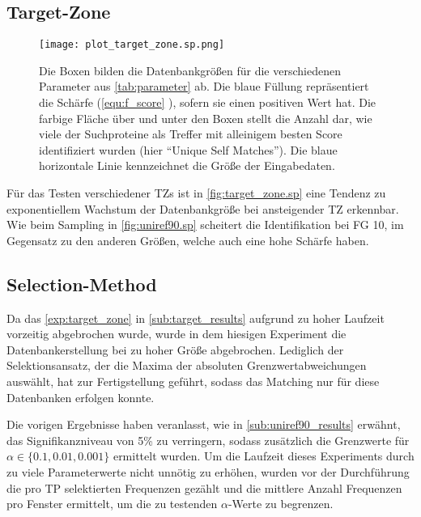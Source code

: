     \subsection{Target-Zone} %
        \label{sub:target_results}
        \begin{figure}[H]
            \centering
            \texttt{[image: plot\_target\_zone.sp.png]}
            \caption[Single-Protein-Matching ]{Die Boxen bilden die Datenbankgrößen für die verschiedenen Parameter aus \autoref{tab:parameter} ab. Die blaue Füllung repräsentiert die Schärfe (\autoref{equ:f_score} ), sofern sie einen positiven Wert hat. Die farbige Fläche über und unter den Boxen stellt die Anzahl dar, wie viele der Suchproteine als Treffer mit alleinigem besten Score identifiziert wurden (hier ``Unique Self Matches''). Die blaue horizontale Linie kennzeichnet die Größe der Eingabedaten.}
            \label{fig:target_zone.sp}
        \end{figure}

        Für das Testen verschiedener \aclp{TZ} ist in \autoref{fig:target_zone.sp} eine Tendenz zu exponentiellem Wachstum der Datenbankgröße bei ansteigender \ac{TZ} erkennbar. Wie beim Sampling in \autoref{fig:uniref90.sp} scheitert die Identifikation bei \ac{FG} 10, im Gegensatz zu den anderen Größen, welche auch eine hohe Schärfe haben.

    \subsection{Selection-Method} %
        \label{sub:selection_results}
        Da das \autoref{exp:target_zone} in \autoref{sub:target_results} aufgrund zu hoher Laufzeit vorzeitig abgebrochen wurde, wurde in dem hiesigen Experiment die Datenbankerstellung bei zu hoher Größe abgebrochen. Lediglich der Selektionsansatz, der die Maxima der absoluten Grenzwertabweichungen auswählt, hat zur Fertigstellung geführt, sodass das Matching nur für diese Datenbanken erfolgen konnte.

        Die vorigen Ergebnisse haben veranlasst, wie in \autoref{sub:uniref90_results} erwähnt, das Signifikanzniveau von 5\% zu verringern, sodass zusätzlich die Grenzwerte für $\alpha \in \{0.1, 0.01, 0.001\}$ ermittelt wurden. Um die Laufzeit dieses Experiments durch zu viele Parameterwerte nicht unnötig zu erhöhen, wurden vor der Durchführung die pro \ac{TP} selektierten Frequenzen gezählt und die mittlere Anzahl Frequenzen pro Fenster ermittelt, um die zu testenden $\alpha$-Werte zu begrenzen.

